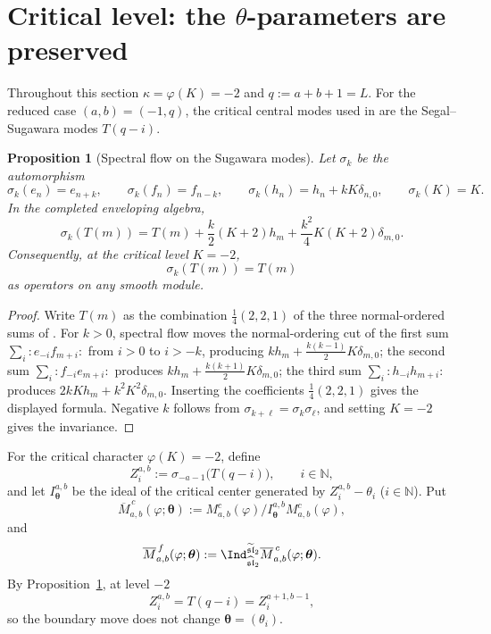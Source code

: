\documentclass[11pt,a4paper]{article}
\newcommand{\N}{\mathbb N}
\newcommand{\slh}{\widehat{\mathfrak{sl}}_2}
\newcommand{\slt}{\widetilde{\mathfrak{sl}}_2}
\theoremstyle{plainupright}
\newtheorem{proposition}{Proposition}[section]
\begin{document}
\section{Critical level: the \(\theta\)-parameters are preserved}\label{sec:critical}

Throughout this section \(\kappa=\varphi(K)=-2\) and
\(q:=a+b+1=L\). For the reduced case \((a,b)=(-1,q)\), the critical central
modes used in \cite{FGXZ} are the Segal--Sugawara modes \(T(q-i)\).

\begin{proposition}[Spectral flow on the Sugawara modes]\label{prop:spectral}
Let \(\sigma_k\) be the automorphism
\[
\sigma_k(e_n)=e_{n+k},\qquad
\sigma_k(f_n)=f_{n-k},\qquad
\sigma_k(h_n)=h_n+kK\delta_{n,0},\qquad
\sigma_k(K)=K.
\]
In the completed enveloping algebra,
\[
\boxed{\ \sigma_k(T(m))
=T(m)+\frac{k}{2}(K+2)h_m+\frac{k^2}{4}K(K+2)\delta_{m,0}.\ }
\]
Consequently, at the critical level \(K=-2\),
\[
\boxed{\ \sigma_k(T(m))=T(m)\ }
\]
as operators on any smooth module.
\end{proposition}

\begin{proof}
Write \(T(m)\) as the combination \(\tfrac14(2,2,1)\) of the three
normal-ordered sums of \cite[formula (2.3)]{FGXZ}. For \(k>0\), spectral flow
moves the normal-ordering cut of the first sum
\(\sum_i:e_{-i}f_{m+i}:\) from \(i>0\) to \(i>-k\), producing
\(kh_m+\tfrac{k(k-1)}{2}K\delta_{m,0}\); the second sum
\(\sum_i:f_{-i}e_{m+i}:\) produces
\(kh_m+\tfrac{k(k+1)}{2}K\delta_{m,0}\); the third sum
\(\sum_i:h_{-i}h_{m+i}:\) produces
\(2kKh_m+k^2K^2\delta_{m,0}\). Inserting the coefficients
\(\tfrac14(2,2,1)\) gives the displayed formula. Negative \(k\) follows from
\(\sigma_{k+\ell}=\sigma_k\sigma_\ell\), and setting \(K=-2\) gives the
invariance.
\end{proof}

For the critical character \(\varphi(K)=-2\), define
\[
Z_i^{a,b}:=\sigma_{-a-1}\bigl(T(q-i)\bigr),\qquad i\in\N,
\]
and let \(I^{a,b}_{\boldsymbol\theta}\) be the ideal of the critical center
generated by \(Z_i^{a,b}-\theta_i\) (\(i\in\N\)). Put
\[
\overline M^{\,c}_{a,b}(\varphi;\boldsymbol\theta)
:=M^c_{a,b}(\varphi)/I^{a,b}_{\boldsymbol\theta}M^c_{a,b}(\varphi),
\]
and
\[
\overline M^{\,f}_{a,b}(\varphi;\boldsymbol\theta)
:=\Ind_{\slh}^{\slt}\overline M^{\,c}_{a,b}(\varphi;\boldsymbol\theta).
\]
By Proposition~\ref{prop:spectral}, at level \(-2\)
\[
Z_i^{a,b}=T(q-i)=Z_i^{a+1,b-1},
\]
so the boundary move does not change \(\boldsymbol\theta=(\theta_i)\).
\end{document}
